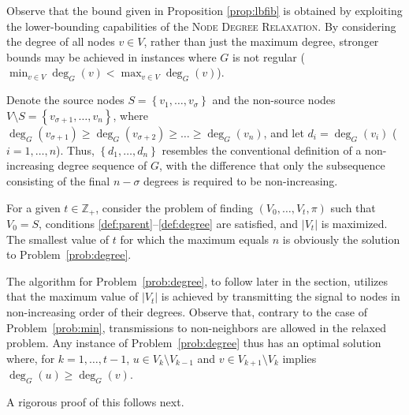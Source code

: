 Observe that the bound given in Proposition \ref{prop:lbfib} is obtained by exploiting the lower-bounding capabilities of the \textsc{Node Degree Relaxation}.
By considering the degree of all nodes $v\in V$, rather than just the maximum degree, stronger bounds may be achieved in instances where $G$ is not regular
($\min_{v\in V}\deg_G(v)<\max_{v\in V}\deg_G(v)$).

Denote the source nodes $S=\left\{v_1,\dots,v_{\sigma}\right\}$ and the non-source nodes $V\setminus S=\left\{v_{\sigma+1},\ldots,v_n\right\}$,
where $\deg_G(v_{\sigma+1})\geq\deg_G(v_{\sigma+2})\geq\dots\geq\deg_G(v_n)$,
and let $d_i=\deg_G(v_i)$ ($i=1,\ldots,n$).
Thus, $\left\{d_1,\ldots,d_n\right\}$ resembles the conventional definition of a non-increasing degree sequence of $G$,
with the difference that only the subsequence consisting of the final $n-\sigma$ degrees is required to be non-increasing.

For a given $t\in\mathbb{Z}_+$, consider the problem of finding $\left(V_0,\ldots,V_t,\pi\right)$ such that $V_0=S$,
conditions \ref{def:parent}--\ref{def:degree} are satisfied, and $\left|V_t\right|$ is maximized.
The smallest value of $t$ for which the maximum equals $n$ is obviously the solution to Problem~\ref{prob:degree}.

The algorithm for Problem~\ref{prob:degree}, to follow later in the section, utilizes that the maximum value of $\left|V_t\right|$
is achieved by transmitting the signal to nodes in non-increasing order of their degrees.
Observe that, contrary to the case of Problem~\ref{prob:min}, transmissions to non-neighbors are allowed in the relaxed problem.
Any instance of Problem~\ref{prob:degree} thus has an optimal solution where, for $k=1,\ldots,t-1$,
$u\in V_k\setminus V_{k-1}$ and $v\in V_{k+1}\setminus V_k$ implies $\deg_G(u)\geq\deg_G(v)$.

A rigorous proof of this follows next.

